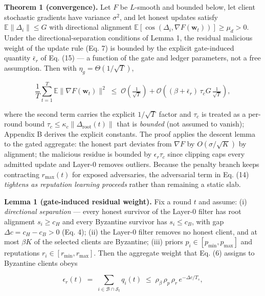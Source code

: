 \documentclass[cmc,article,submit,moreauthors,pdftex]{Definitions/tsp}
\begin{document}
\textbf{Theorem 1 (convergence).} Let $F$ be $L$-smooth and bounded below, let client stochastic gradients have variance $\sigma^2$, and let honest updates satisfy $\mathbb{E}\|\Delta_i\| \le G$ with directional alignment $\mathbb{E}[\cos(\Delta_i, \nabla F(\mathbf{w}_t))] \ge \mu_d > 0$. Under the directional-separation conditions of Lemma 1, the residual malicious weight of the update rule (Eq. 7) is bounded by the explicit gate-induced quantity $\bar\epsilon_r$ of Eq. (15) --- a function of the gate and ledger parameters, not a free assumption. Then with $\eta_g = \Theta(1/\sqrt{T})$,

\begin{equation}
\frac{1}{T}\sum_{t=1}^{T} \mathbb{E}\|\nabla F(\mathbf{w}_t)\|^2 \;\le\; \mathcal{O}\!\left(\tfrac{1}{\sqrt{T}}\right) + \mathcal{O}\!\left((\beta + \bar\epsilon_r)\,\tau_c G\, \tfrac{1}{\sqrt{T}}\right),
\tag{14}
\end{equation}

where the second term carries the explicit $1/\sqrt{T}$ factor and $\tau_c$ is treated as a per-round bound $\tau_c \le \kappa_c\|\Delta_{\mathrm{root}}(t)\|$ that is \emph{bounded} (not assumed to vanish); Appendix B derives the explicit constants. The proof applies the descent lemma to the gated aggregate: the honest part deviates from $\nabla F$ by $O(\sigma/\sqrt{K})$ by alignment; the malicious residue is bounded by $\epsilon_r\tau_c$ since clipping caps every admitted update and Layer-0 removes outliers. Because the penalty branch keeps contracting $r_{\max}(t)$ for exposed adversaries, the adversarial term in Eq. (14) \emph{tightens as reputation learning proceeds} rather than remaining a static slab.

\textbf{Lemma 1 (gate-induced residual weight).} Fix a round $t$ and assume: (i) \emph{directional separation} --- every honest survivor of the Layer-0 filter has root alignment $s_i \ge c_H$ and every Byzantine survivor has $s_i \le c_B$, with gap $\Delta c = c_H - c_B > 0$ (Eq. 4); (ii) the Layer-0 filter removes no honest client, and at most $\beta K$ of the selected clients are Byzantine; (iii) priors $p_i \in [p_{\min}, p_{\max}]$ and reputations $r_i \in [r_{\min}, r_{\max}]$. Then the aggregate weight that Eq. (6) assigns to Byzantine clients obeys

\begin{equation}
\epsilon_r(t) \;=\; \sum_{i \in \mathcal{B} \cap \mathcal{S}_t} q_i(t) \;\le\; \rho_\beta\, \rho_p\, \rho_r\, e^{-\Delta c/T_s},
\tag{15}
\end{equation}
\end{document}
